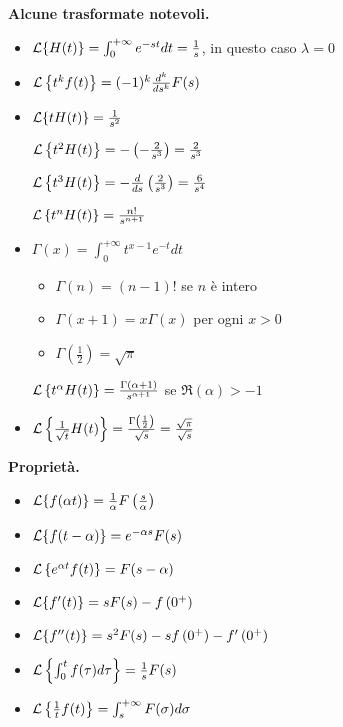 \textbf{Alcune trasformate notevoli.}
\begin{itemize}
\item $\mathcal{L}\{H( t)\} =\int ^{+\infty }_{0} e^{-st} dt=\frac{1}{s}$, in questo caso $\lambda =0$
\item $\mathcal{L}\left\{t^{k} f( t)\right\} =( -1)^{k}\frac{d^{k}}{ds^{k}} F( s)$
\item $\mathcal{L}\{tH( t)\} =\frac{1}{s^{2}}$

$\mathcal{L}\left\{t^{2} H( t)\right\} =-\left( -\frac{2}{s^{3}}\right) =\frac{2}{s^{3}}$

$\mathcal{L}\left\{t^{3} H( t)\right\} =-\frac{d}{ds}\left(\frac{2}{s^{3}}\right) =\frac{6}{s^{4}}$

$\mathcal{L}\left\{t^{n} H( t)\right\} =\frac{n!}{s^{n+1}}$
\item $\Gamma ( x) =\int ^{+\infty }_{0} t^{x-1} e^{-t} dt$
\begin{itemize}
\item $\Gamma ( n) =( n-1) !$ se $n$ è intero
\item $\Gamma ( x+1) =x\Gamma ( x)$ per ogni $x >0$
\item $\Gamma \left(\frac{1}{2}\right) =\sqrt{\pi }$
\end{itemize}

$\mathcal{L}\left\{t^{\alpha } H( t)\right\} =\frac{\Gamma ( \alpha +1)}{s^{\alpha +1}}$ se $\Re ( \alpha )  >-1$
\item $\mathcal{L}\left\{\frac{1}{\sqrt{t}} H( t)\right\} =\frac{\Gamma \left(\frac{1}{2}\right)}{\sqrt{s}} =\frac{\sqrt{\pi }}{\sqrt{s}}$
\end{itemize}

\textbf{Proprietà.}
\begin{itemize}
\item $\mathcal{L}\{f( \alpha t)\} =\frac{1}{\alpha } F\left(\frac{s}{\alpha }\right)$
\item $\mathcal{L}\{f( t-\alpha )\} =e^{-\alpha s} F( s)$
\item $\mathcal{L}\left\{e^{\alpha t} f( t)\right\} =F( s-\alpha )$
\item $\mathcal{L}\{f'( t)\} =sF( s) -f\left( 0^{+}\right)$
\item $\mathcal{L}\{f''( t)\} =s^{2} F( s) -sf\left( 0^{+}\right) -f'\left( 0^{+}\right)$
\item $\mathcal{L}\left\{\int ^{t}_{0} f( \tau ) d\tau \right\} =\frac{1}{s} F( s)$
\item $\mathcal{L}\left\{\frac{1}{t} f( t)\right\} =\int ^{+\infty }_{s} F( \sigma ) d\sigma $
\end{itemize}

